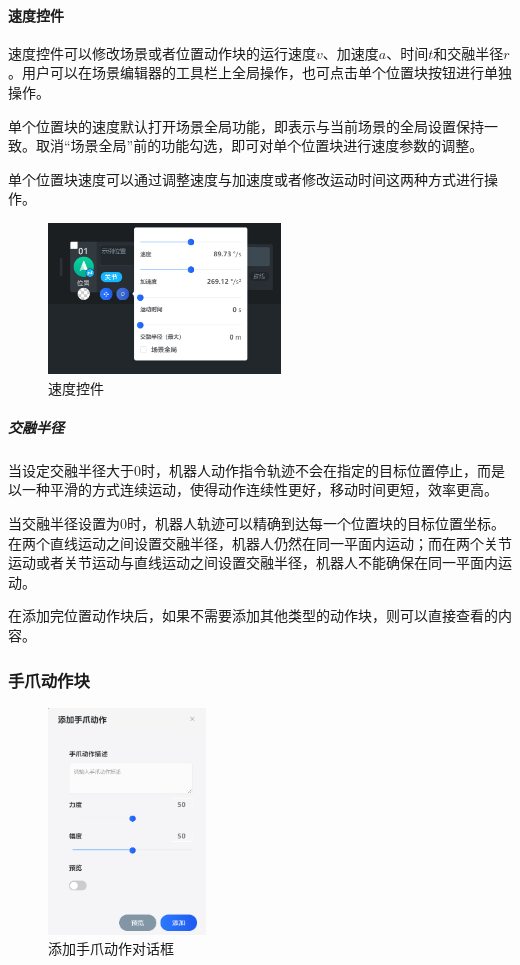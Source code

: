 \paragraph{速度控件}
速度控件可以修改场景或者位置动作块的运行速度$v$、加速度$a$、时间$t$和交融半径$r$。用户可以在场景编辑器的工具栏上全局操作，也可点击单个位置块按钮进行单独操作。

单个位置块的速度默认打开场景全局功能，即表示与当前场景的全局设置保持一致。取消“场景全局”前的功能勾选，即可对单个位置块进行速度参数的调整。

单个位置块速度可以通过调整速度与加速度或者修改运动时间这两种方式进行操作。

\begin{figure}[ht]
	\centering
	\includegraphics[height=4cm]{image/07/图3.11 速度与加速时间调整控件.png}
	\caption{速度控件}
	\label{fig:速度控件}
\end{figure}

\subparagraph{交融半径}

当设定交融半径大于0时，机器人动作指令轨迹不会在指定的目标位置停止，而是以一种平滑的方式连续运动，使得动作连续性更好，移动时间更短，效率更高。

当交融半径设置为0时，机器人轨迹可以精确到达每一个位置块的目标位置坐标。在两个直线运动之间设置交融半径，机器人仍然在同一平面内运动；而在两个关节运动或者关节运动与直线运动之间设置交融半径，机器人不能确保在同一平面内运动。


在添加完位置动作块后，如果不需要添加其他类型的动作块，则可以直接查看的内容。

\subsubsection{手爪动作块}

\begin{figure}[htb]
	\centering
	\includegraphics[height=6cm]{screen/3-12.png}
	\caption{添加手爪动作对话框}
	\label{fig:添加手爪动作对话框}
\end{figure}

